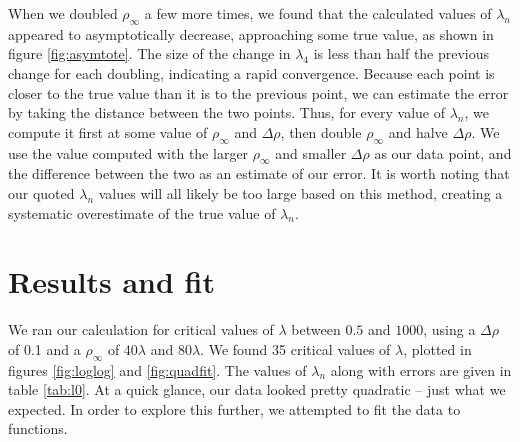 \documentclass[12pt,twoside]{reedthesis}
\begin{document}
When we doubled $\rho_{\infty}$ a few more times, we found that the calculated values of $\lambda_{n}$ appeared to asymptotically decrease, approaching some true value, as shown in figure \ref{fig:asymtote}. The size of the change in $\lambda_4$ is less than half the previous change for each doubling, indicating a rapid convergence. Because each point is closer to the true value than it is to the previous point, we can estimate the error by taking the distance between the two points. Thus, for every value of $\lambda_n$, we compute it first at some value of $\rho_{\infty}$ and $\Delta \rho$, then double $\rho_{\infty}$ and halve $\Delta \rho$. We use the value computed with the larger $\rho_{\infty}$ and smaller $\Delta \rho$ as our data point, and the difference between the two as an estimate of our error.  It is worth noting that our quoted $\lambda_n$ values will all likely be too large based on this method, creating a systematic overestimate of the true value of $\lambda_n$.
 
\section{Results and fit}
We ran our calculation for critical values of $\lambda$ between $0.5$ and $1000$, using a $\Delta \rho$ of 0.1 and a $\rho_{\infty}$ of $40 \lambda$ and $80 \lambda$. We found 35 critical values of $\lambda$, plotted in figures \ref{fig:loglog} and \ref{fig:quadfit}. The values of $\lambda_n$ along with errors are given in table \ref{tab:l0}. At a quick glance, our data looked pretty quadratic -- just what we expected. In order to explore this further, we attempted to fit the data to functions.
\end{document}

